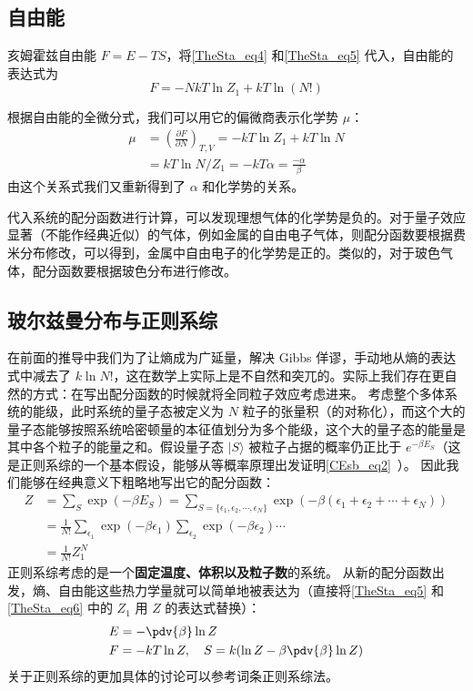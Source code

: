 \subsection{自由能}
亥姆霍兹自由能 $F=E-TS$，将\autoref{TheSta_eq4} 和\autoref{TheSta_eq5} 代入，自由能的表达式为
\begin{equation}\label{TheSta_eq6}
F=-NkT\ln Z_1+kT\ln(N!)
\end{equation}

根据自由能的全微分式，我们可以用它的偏微商表示化学势 $\mu$：
\begin{equation}
\begin{aligned}
\mu&=\left(\frac{\partial F}{\partial N}\right)_{T,V}=-kT\ln Z_1+kT\ln N\\
&=kT\ln N/Z_1=-kT\alpha=\frac{-\alpha}{\beta}
\end{aligned}
\end{equation}
由这个关系式我们又重新得到了 $\alpha$ 和化学势的关系。

代入系统的配分函数进行计算，可以发现理想气体的化学势是负的。对于量子效应显著（不能作经典近似）的气体，例如金属的自由电子气体，则配分函数要根据费米分布修改，可以得到，金属中自由电子的化学势是正的。类似的，对于玻色气体，配分函数要根据玻色分布进行修改。

\subsection{玻尔兹曼分布与正则系综}
在前面的推导中我们为了让熵成为广延量，解决 Gibbs 佯谬，手动地从熵的表达式中减去了 $k\ln N!$，这在数学上实际上是不自然和突兀的。实际上我们存在更自然的方式：在写出配分函数的时候就将全同粒子效应考虑进来。
考虑整个多体系统的能级，此时系统的量子态被定义为 $N$ 粒子的张量积（的对称化），而这个大的量子态能够按照系统哈密顿量的本征值划分为多个能级，这个大的量子态的能量是其中各个粒子的能量之和。假设量子态 $|S\rangle$ 被粒子占据的概率仍正比于 $e^{-\beta E_S}$（这是正则系综的一个基本假设，能够从等概率原理出发证明\autoref{CEsb_eq2}~）。 因此我们能够在经典意义下粗略地写出它的配分函数：
\begin{equation}
\begin{aligned}
Z&=\sum_{S} \exp(-\beta E_S)=\sum_{S=\{\epsilon_1,\epsilon_2,\cdots,\epsilon_N\}}\exp(-\beta(\epsilon_1+\epsilon_2+\cdots+\epsilon_N))\\
&=\frac{1}{N!} \sum_{\epsilon_1}\exp(-\beta \epsilon_1) \sum_{\epsilon_2}\exp(-\beta\epsilon_2)\cdots\\
&=\frac{1}{N!}Z_1^N
\end{aligned}
\end{equation}
正则系综考虑的是一个\textbf{固定温度、体积以及粒子数}的系统。
从新的配分函数出发，熵、自由能这些热力学量就可以简单地被表达为（直接将\autoref{TheSta_eq5} 和 \autoref{TheSta_eq6} 中的 $Z_1$ 用 $Z$ 的表达式替换）：
\begin{equation}
\begin{aligned}
&E=-\pdv{\beta}\ln Z\\
&F=-kT\ln Z,\quad S=k(\ln Z-\beta \pdv{\beta}\ln Z)
\end{aligned}
\end{equation}
关于正则系综的更加具体的讨论可以参考词条正则系综法。